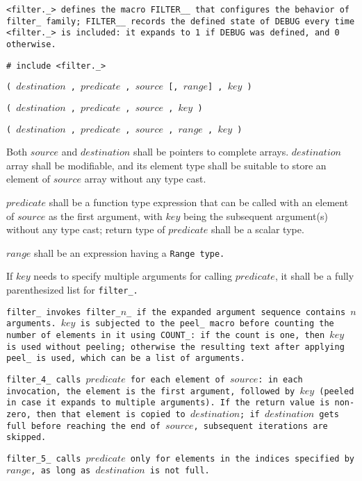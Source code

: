 \tt{<filter._>} defines the macro \tt{FILTER__} that configures the
behavior of \tt{filter_} family;  \tt{FILTER__} records the \tt{defined}
state of \tt{DEBUG} every time \tt{<filter._>} is included:
it expands to \tt{1} if \tt{DEBUG} was defined, and \tt{0} otherwise.


\tt{# include <filter._>}

\s\s\s\tt{(} $destination$ \tt{,}
$predicate$ \tt{,} $source$ [\tt{,} $range$] \tt{,} $key$ \tt{)}

\s\tt{(} $destination$ \tt{,}
$predicate$ \tt{,} $source$ \phantom{[}\tt{,} $key$\phantom{]} \tt{)}

\s\tt{(} $destination$ \tt{,}
$predicate$ \tt{,} $source$ \phantom{[}\tt{,} $range$\phantom{]} \tt{,} $key$ \tt{)}


Both $source$ and $destination$ shall be pointers to complete arrays.
$destination$ array shall be modifiable, and its element type shall be
suitable to store an element of $source$ array without any type cast.

$predicate$ shall be a function type expression that can be called with an element
of $source$ as the first argument, with $key$ being the subsequent argument(s)
without any type cast; return type of $predicate$ shall be a scalar type.

$range$ shall be an expression having a \tt{Range} type.

If $key$ needs to specify multiple arguments for calling $predicate$,
it shall be a fully parenthesized list for \tt{filter_}.


\tt{filter_} invokes \tt{filter_}$n$\_ if the
expanded argument sequence contains $n$ arguments.
$key$ is subjected to the \tt{peel_} macro before counting the
number of elements in it using \tt{COUNT_}: if the count is one,
then $key$ is used without peeling; otherwise the resulting text
after applying \tt{peel_} is used, which can be a list of arguments.

\tt{filter_4_} calls $predicate$ for each element of $source$:
in each invocation, the element is the first argument, followed
by $key$ (peeled in case it expands to multiple arguments).
If the return value is non-zero, then that element is copied
to $destination$; if $destination$ gets full before reaching
the end of $source$, subsequent iterations are skipped.

\tt{filter_5_} calls $predicate$ only for elements in the indices
specified by $range$, as long as $destination$ is not full.

\enlargethispage*{\baselineskip}
\pagebreak
